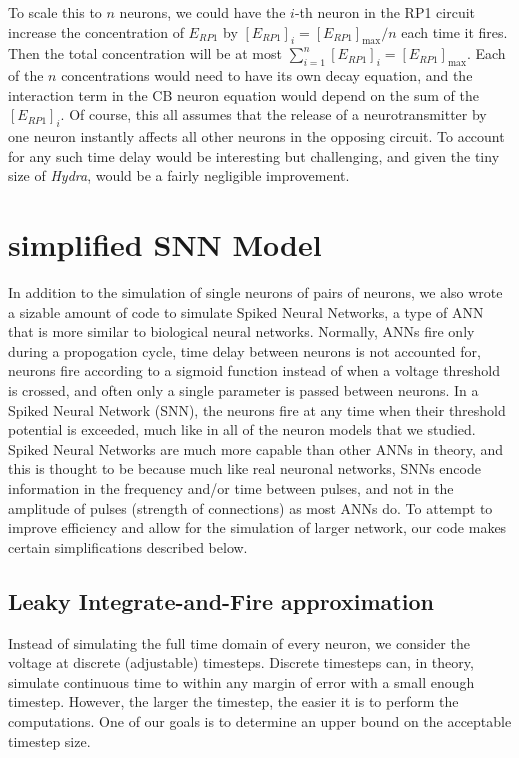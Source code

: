 \documentclass{article}
\begin{document}
To scale this to $n$ neurons, we could have the $i$-th neuron in the RP1 circuit increase the concentration of $E_{RP1}$ by $[E_{RP1}]_{i}=[E_{RP1}]_{\max}/n$ each time it fires. Then the total concentration will be at most $\sum_{i=1}^{n}[E_{RP1}]_{i}=[E_{RP1}]_{\max}$. Each of the $n$ concentrations would need to have its own decay equation, and the interaction term in the CB neuron equation would depend on the sum of the $[E_{RP1}]_{i}$. Of course, this all assumes that the release of a neurotransmitter by one neuron instantly affects all other neurons in the opposing circuit. To account for any such time delay would be interesting but challenging, and given the tiny size of \textit{Hydra}, would be a fairly negligible improvement. 

\newpage

\section{simplified SNN Model}

In addition to the simulation of single neurons of pairs of neurons, we also wrote a sizable amount of code to simulate Spiked Neural Networks, a type of ANN that is more similar to biological neural networks. Normally, ANNs fire only during a propogation cycle, time delay between neurons is not accounted for, neurons fire according to a sigmoid function instead of when a voltage threshold is crossed, and often only a single parameter is passed between neurons. In a Spiked Neural Network (SNN), the neurons fire at any time when their threshold potential is exceeded, much like in all of the neuron models that we studied. Spiked Neural Networks are much more capable than other ANNs in theory, and this is thought to be because much like real neuronal networks, SNNs encode information in the frequency and/or time between pulses, and not in the amplitude of pulses (strength of connections) as most ANNs do. To attempt to improve efficiency and allow for the simulation of larger network, our code makes certain simplifications described below.

\subsection{Leaky Integrate-and-Fire approximation} \label{LIF_code}

Instead of simulating the full time domain of every neuron, we consider the voltage at discrete (adjustable) timesteps. Discrete timesteps can, in theory, simulate continuous time to within any margin of error with a small enough timestep. However, the larger the timestep, the easier it is to perform the computations. One of our goals is to determine an upper bound on the acceptable timestep size.
\end{document}
